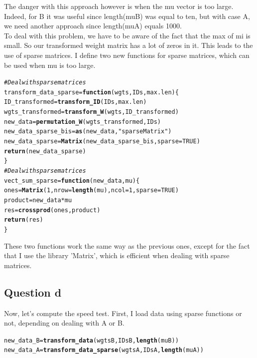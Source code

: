 \documentclass{llncs}\usepackage[]{graphicx}\usepackage[]{color}
\makeatletter
\newcommand{\hlnum}[1]{\textcolor[rgb]{0.686,0.059,0.569}{#1}}%
\newcommand{\hlstr}[1]{\textcolor[rgb]{0.192,0.494,0.8}{#1}}%
\newcommand{\hlcom}[1]{\textcolor[rgb]{0.678,0.584,0.686}{\textit{#1}}}%
\newcommand{\hlopt}[1]{\textcolor[rgb]{0,0,0}{#1}}%
\newcommand{\hlstd}[1]{\textcolor[rgb]{0.345,0.345,0.345}{#1}}%
\newcommand{\hlkwa}[1]{\textcolor[rgb]{0.161,0.373,0.58}{\textbf{#1}}}%
\newcommand{\hlkwb}[1]{\textcolor[rgb]{0.69,0.353,0.396}{#1}}%
\newcommand{\hlkwc}[1]{\textcolor[rgb]{0.333,0.667,0.333}{#1}}%
\newcommand{\hlkwd}[1]{\textcolor[rgb]{0.737,0.353,0.396}{\textbf{#1}}}%
\newenvironment{kframe}{%
 \def\at@end@of@kframe{}%
 \ifinner\ifhmode%
  \def\at@end@of@kframe{\end{minipage}}%
  \begin{minipage}{\columnwidth}%
 \fi\fi%
 \def\FrameCommand##1{\hskip\@totalleftmargin \hskip-\fboxsep
 \colorbox{shadecolor}{##1}\hskip-\fboxsep
     \hskip-\linewidth \hskip-\@totalleftmargin \hskip\columnwidth}%
 \MakeFramed {\advance\hsize-\width
   \@totalleftmargin\z@ \linewidth\hsize
   \@setminipage}}%
 {\par\unskip\endMakeFramed%
 \at@end@of@kframe}
\newenvironment{knitrout}{}{} %
\makeatother
\begin{document}
\noindent
The danger with this approach however is when the mu vector is too large. Indeed, for B it was useful since length(muB) was equal to ten, but with case A, we need another approach since length(muA) equals 1000.\\
To deal with this problem, we have to be aware of the fact that the max of mi is small. So our transformed weight matrix has a lot of zeros in it. This leads to the use of sparse matrices. I define two new functions for sparse matrices, which can be used when mu is too large.
\begin{knitrout}
\color{fgcolor}\begin{kframe}
\begin{alltt}
\hlcom{# Deal with sparse matrices}
\hlstd{transform_data_sparse} \hlkwb{=} \hlkwa{function}\hlstd{(}\hlkwc{wgts}\hlstd{,}\hlkwc{IDs}\hlstd{,}\hlkwc{max.len}\hlstd{)\{}
  \hlstd{ID_transformed}\hlkwb{=}\hlkwd{transform_ID}\hlstd{(IDs,max.len)}
  \hlstd{wgts_transformed}\hlkwb{=}\hlkwd{transform_W}\hlstd{(wgts,ID_transformed)}
  \hlstd{new_data}\hlkwb{=}\hlkwd{permutation_W}\hlstd{(wgts_transformed,IDs)}
  \hlstd{new_data_sparse_bis}\hlkwb{=}\hlkwd{as}\hlstd{(new_data,}\hlstr{"sparseMatrix"}\hlstd{)}
  \hlstd{new_data_sparse}\hlkwb{=}\hlkwd{Matrix}\hlstd{(new_data_sparse_bis,} \hlkwc{sparse} \hlstd{=} \hlnum{TRUE}\hlstd{)}
  \hlkwd{return}\hlstd{(new_data_sparse)}
\hlstd{\}}
\hlcom{# Deal with sparse matrices}
\hlstd{vect_sum_sparse} \hlkwb{=} \hlkwa{function}\hlstd{(}\hlkwc{new_data}\hlstd{,} \hlkwc{mu}\hlstd{)\{}
  \hlstd{ones}\hlkwb{=} \hlkwd{Matrix}\hlstd{(}\hlnum{1}\hlstd{,}\hlkwc{nrow}\hlstd{=}\hlkwd{length}\hlstd{(mu),}\hlkwc{ncol}\hlstd{=}\hlnum{1}\hlstd{,}\hlkwc{sparse} \hlstd{=} \hlnum{TRUE}\hlstd{)}
  \hlstd{product}\hlkwb{=}\hlstd{new_data}\hlopt{*}\hlstd{mu}
  \hlstd{res}\hlkwb{=}\hlkwd{crossprod}\hlstd{(ones,product)}
  \hlkwd{return}\hlstd{(res)}
\hlstd{\}}
\end{alltt}
\end{kframe}
\end{knitrout}
\noindent
These two functions work the same way as the previous ones, except for the fact that I use the library 'Matrix', which is efficient when dealing with sparse matrices.\\

\subsection{Question d}
Now, let's compute the speed test. First, I load data using sparse functions or not, depending on dealing with A or B.
\begin{knitrout}
\color{fgcolor}\begin{kframe}
\begin{alltt}
\hlstd{new_data_B}\hlkwb{=}\hlkwd{transform_data}\hlstd{(wgtsB,IDsB,}\hlkwd{length}\hlstd{(muB))}
\hlstd{new_data_A}\hlkwb{=}\hlkwd{transform_data_sparse}\hlstd{(wgtsA,IDsA,}\hlkwd{length}\hlstd{(muA))}
\end{alltt}
\end{kframe}
\end{knitrout}
\end{document}
